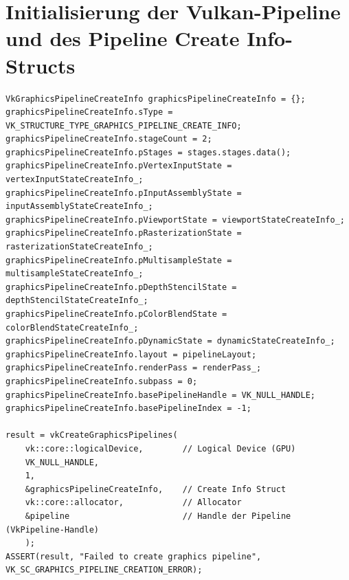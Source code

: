 \documentclass[titlepage, 11pt, a4paper, ngerman]{article}
\begin{document}
\section{Initialisierung der Vulkan-Pipeline und des Pipeline Create Info-Structs}
\begin{verbatim}
VkGraphicsPipelineCreateInfo graphicsPipelineCreateInfo = {};
graphicsPipelineCreateInfo.sType = VK_STRUCTURE_TYPE_GRAPHICS_PIPELINE_CREATE_INFO;
graphicsPipelineCreateInfo.stageCount = 2;
graphicsPipelineCreateInfo.pStages = stages.stages.data();
graphicsPipelineCreateInfo.pVertexInputState = vertexInputStateCreateInfo_;
graphicsPipelineCreateInfo.pInputAssemblyState = inputAssemblyStateCreateInfo_;
graphicsPipelineCreateInfo.pViewportState = viewportStateCreateInfo_;
graphicsPipelineCreateInfo.pRasterizationState = rasterizationStateCreateInfo_;
graphicsPipelineCreateInfo.pMultisampleState = multisampleStateCreateInfo_;
graphicsPipelineCreateInfo.pDepthStencilState = depthStencilStateCreateInfo_;
graphicsPipelineCreateInfo.pColorBlendState = colorBlendStateCreateInfo_;
graphicsPipelineCreateInfo.pDynamicState = dynamicStateCreateInfo_;
graphicsPipelineCreateInfo.layout = pipelineLayout;
graphicsPipelineCreateInfo.renderPass = renderPass_;
graphicsPipelineCreateInfo.subpass = 0;
graphicsPipelineCreateInfo.basePipelineHandle = VK_NULL_HANDLE;
graphicsPipelineCreateInfo.basePipelineIndex = -1;

result = vkCreateGraphicsPipelines(
    vk::core::logicalDevice,        // Logical Device (GPU)
    VK_NULL_HANDLE,
    1,
    &graphicsPipelineCreateInfo,    // Create Info Struct
    vk::core::allocator,            // Allocator
    &pipeline                       // Handle der Pipeline (VkPipeline-Handle)
    );
ASSERT(result, "Failed to create graphics pipeline", VK_SC_GRAPHICS_PIPELINE_CREATION_ERROR);
\end{verbatim}


\newpage
\end{document}
